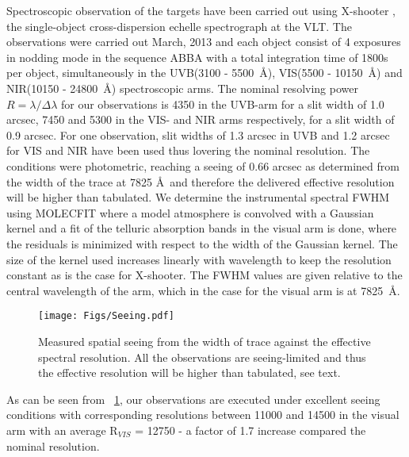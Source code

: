 \documentclass{aa}    %
\newcommand{\figref}[1]{\ref{fig:#1}}
\newcommand{\Fig}[1]{\figurename~\figref{#1}}
\newcommand{\fig}[1]{\Fig{#1}}
\newcommand{\figlabel}[1]{\label{fig:#1}}
\begin{document}
Spectroscopic observation of the targets have been carried out using X-shooter \citep{Vernet2011}, the single-object cross-dispersion echelle spectrograph at the VLT. The observations were carried out March, 2013 and each object consist of 4 exposures in nodding mode in the sequence ABBA with a total integration time of 1800s per object, simultaneously in the UVB(3100 - 5500~\AA), VIS(5500 - 10150~\AA)  and NIR(10150 - 24800~\AA) spectroscopic arms. The nominal resolving power $R = \lambda / \Delta \lambda$ for our observations is 4350 in the UVB-arm for a slit width of 1.0 arcsec, 7450 and 5300 in the VIS- and NIR arms respectively, for a slit width of 0.9 arcsec. For one observation, slit widths of 1.3 arcsec in UVB and 1.2 arcsec for VIS and NIR have been used thus lovering the nominal resolution. The conditions were photometric, reaching a seeing of 0.66 arcsec as determined from the width of the trace at 7825 \AA~and therefore the delivered effective resolution will be higher than tabulated. We determine the instrumental spectral FWHM using MOLECFIT \citep{Smette2015, Kausch2015} where a model atmosphere is convolved with a Gaussian kernel and a fit of the telluric absorption bands in the visual arm is done, where the residuals is minimized with respect to the width of the Gaussian kernel. The size of the kernel used increases linearly with wavelength to keep the resolution constant as is the case for X-shooter. The FWHM values are given relative to the central wavelength of the arm, which in the case for the visual arm is at 7825~\AA. 


\begin{figure}[t!]
  \centering
  \texttt{[image: Figs/Seeing.pdf]}
  \caption[]{Measured spatial seeing from the width of trace against the effective spectral resolution. All the observations are seeing-limited and thus the effective resolution will be higher than tabulated, see text.}
\figlabel{seeing}
\end{figure}



As can be seen from \fig{seeing}, our observations are executed under excellent seeing conditions with corresponding resolutions between 11000 and 14500 in the visual arm with an average R$_{VIS}$ = 12750 - a factor of 1.7 increase compared the nominal resolution. 
\end{document}
